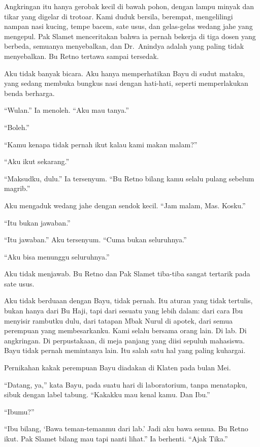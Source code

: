 \documentclass[11pt,twoside,openany]{book}
\makeatletter
\newcommand{\scenebreak}{\par\vspace{0.9em}{\centering\textsc{*\hspace{0.7em}*\hspace{0.7em}*}\par}\vspace{0.9em}\@afterindentfalse\@afterheading}
\makeatother
\begin{document}
\scenebreak
Angkringan itu hanya gerobak kecil di bawah pohon, dengan lampu minyak dan tikar yang digelar di trotoar. Kami duduk bersila, berempat, mengelilingi nampan nasi kucing, tempe bacem, sate usus, dan gelas-gelas wedang jahe yang mengepul. Pak Slamet menceritakan bahwa ia pernah bekerja di tiga dosen yang berbeda, semuanya menyebalkan, dan Dr.~Anindya adalah yang paling tidak menyebalkan. Bu Retno tertawa sampai tersedak.

Aku tidak banyak bicara. Aku hanya memperhatikan Bayu di sudut mataku, yang sedang membuka bungkus nasi dengan hati-hati, seperti memperlakukan benda berharga.

``Wulan.'' Ia menoleh. ``Aku mau tanya.''

``Boleh.''

``Kamu kenapa tidak pernah ikut kalau kami makan malam?''

``Aku ikut sekarang.''

``Maksudku, dulu.'' Ia tersenyum. ``Bu Retno bilang kamu selalu pulang sebelum magrib.''

Aku mengaduk wedang jahe dengan sendok kecil. ``Jam malam, Mas. Kosku.''

``Itu bukan jawaban.''

``Itu jawaban.'' Aku tersenyum. ``Cuma bukan seluruhnya.''

``Aku bisa menunggu seluruhnya.''

Aku tidak menjawab. Bu Retno dan Pak Slamet tiba-tiba sangat tertarik pada sate usus.

Aku tidak berduaan dengan Bayu, tidak pernah. Itu aturan yang tidak tertulis, bukan hanya dari Bu Haji, tapi dari sesuatu yang lebih dalam: dari cara Ibu menyisir rambutku dulu, dari tatapan Mbak Nurul di apotek, dari semua perempuan yang membesarkanku. Kami selalu bersama orang lain. Di lab. Di angkringan. Di perpustakaan, di meja panjang yang diisi sepuluh mahasiswa. Bayu tidak pernah memintanya lain. Itu salah satu hal yang paling kuhargai.

\scenebreak
Pernikahan kakak perempuan Bayu diadakan di Klaten pada bulan Mei.

``Datang, ya,'' kata Bayu, pada suatu hari di laboratorium, tanpa menatapku, sibuk dengan label tabung. ``Kakakku mau kenal kamu. Dan Ibu.''

``Ibumu?''

``Ibu bilang, `Bawa teman-temanmu dari lab.' Jadi aku bawa semua. Bu Retno ikut. Pak Slamet bilang mau tapi nanti lihat.'' Ia berhenti. ``Ajak Tika.''
\end{document}
